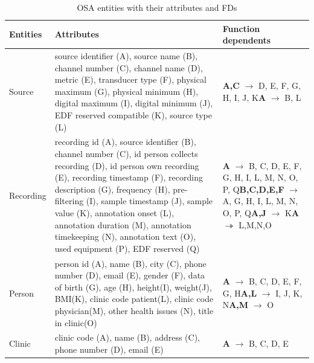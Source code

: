 \begin{table}[ht]
\begin{center}
\begin{tabular}{ |p{1.5cm}||p{5cm}|p{6.5cm}|  }
 \hline
 Entities& Attributes& Function dependents\\
 \hline
 Source& source identifier (A), source name (B), channel number (C), channel name (D), metric (E), transducer type (F), physical maximum (G), physical minimum (H), digital maximum (I), digital minimum (J), EDF reserved compatible (K), source type (L)& \textbf{A,C} $\rightarrow$ D, E, F, G, H, I, J, K\newline \textbf{A} $\rightarrow$ B, L\\
 \hline
 Recording& recording id (A), source identifier (B), channel number (C), id person collects recording (D), id person own recording (E), recording timestamp (F), recording description (G), frequency (H), pre-filtering (I), sample timestamp (J), sample value (K), annotation onset (L), annotation duration (M), annotation timekeeping (N), annotation text (O), used equipment (P), EDF reserved (Q)& \textbf{A} $\rightarrow$ B, C, D, E, F, G, H, I, L, M, N, O, P, Q\newline \textbf{B,C,D,E,F} $\rightarrow$ A, G, H, I, L, M, N, O, P, Q\newline \textbf{A,J} $\rightarrow$ K\newline \textbf{A} $\twoheadrightarrow$ L,M,N,O\\
 \hline
 Person& person id (A), name (B), city (C), phone number (D), email (E), gender (F), data of birth (G), age (H), height(I), weight(J), BMI(K), clinic code patient(L), clinic code physician(M), other health issues (N), title in clinic(O)& \textbf{A} $\rightarrow$ B, C, D, E, F, G, H\newline \textbf{A,L} $\rightarrow$ I, J, K, N\newline \textbf{A,M} $\rightarrow$ O\\
 \hline
 Clinic& clinic code (A), name (B), address (C), phone number (D), email (E)& \textbf{A} $\rightarrow$ B, C, D, E\\
 \hline
\end{tabular}
\end{center}
\caption{OSA entities with their attributes and FDs}
\label{tab:EntitiesFDs}
\end{table}


